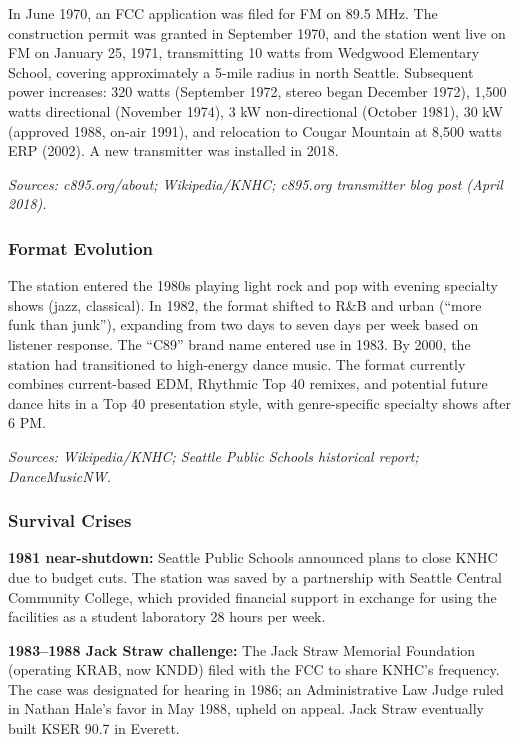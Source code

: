 \documentclass[11pt,letterpaper]{article}
\begin{document}
In June 1970, an FCC application was filed for FM on 89.5 MHz. The construction permit was granted in September 1970, and the station went live on FM on January 25, 1971, transmitting 10 watts from Wedgwood Elementary School, covering approximately a 5-mile radius in north Seattle. Subsequent power increases: 320 watts (September 1972, stereo began December 1972), 1,500 watts directional (November 1974), 3 kW non-directional (October 1981), 30 kW (approved 1988, on-air 1991), and relocation to Cougar Mountain at 8,500 watts ERP (2002). A new transmitter was installed in 2018.

\textit{Sources: c895.org/about; Wikipedia/KNHC; c895.org transmitter blog post (April 2018).}

\subsubsection{Format Evolution}

The station entered the 1980s playing light rock and pop with evening specialty shows (jazz, classical). In 1982, the format shifted to R\&B and urban (``more funk than junk''), expanding from two days to seven days per week based on listener response. The ``C89'' brand name entered use in 1983. By 2000, the station had transitioned to high-energy dance music. The format currently combines current-based EDM, Rhythmic Top 40 remixes, and potential future dance hits in a Top 40 presentation style, with genre-specific specialty shows after 6 PM.

\textit{Sources: Wikipedia/KNHC; Seattle Public Schools historical report; DanceMusicNW.}

\subsubsection{Survival Crises}

\textbf{1981 near-shutdown:} Seattle Public Schools announced plans to close KNHC due to budget cuts. The station was saved by a partnership with Seattle Central Community College, which provided financial support in exchange for using the facilities as a student laboratory 28 hours per week.

\textbf{1983--1988 Jack Straw challenge:} The Jack Straw Memorial Foundation (operating KRAB, now KNDD) filed with the FCC to share KNHC's frequency. The case was designated for hearing in 1986; an Administrative Law Judge ruled in Nathan Hale's favor in May 1988, upheld on appeal. Jack Straw eventually built KSER 90.7 in Everett.
\end{document}
